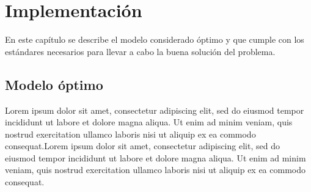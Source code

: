 \chapter{Implementación} \label{intro_chapter}

En este capítulo se describe el modelo considerado óptimo y que cumple con los estándares necesarios para llevar a cabo la buena solución del problema. 

\section{Modelo óptimo}
Lorem ipsum dolor sit amet, consectetur adipiscing elit, sed do eiusmod tempor incididunt ut labore et dolore magna aliqua. Ut enim ad minim veniam, quis nostrud exercitation ullamco laboris nisi ut aliquip ex ea commodo consequat.Lorem ipsum dolor sit amet, consectetur adipiscing elit, sed do eiusmod tempor incididunt ut labore et dolore magna aliqua. Ut enim ad minim veniam, quis nostrud exercitation ullamco laboris nisi ut aliquip ex ea commodo consequat.